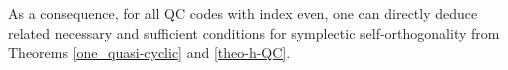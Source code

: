 \documentclass[journal]{IEEEtran}
\newtheorem{corollary}{Corollary}
\newenvironment{proof}{{\noindent\it Proof:} }{\hfill $\square$\par}
\newtheorem{remark}{Remark}
\begin{document}

As a consequence, for all QC codes with index even, one can directly deduce related necessary and sufficient conditions for symplectic self-orthogonality from Theorems \ref{one_quasi-cyclic} and \ref{theo-h-QC}. 


%	
%	
%	
\end{document}
